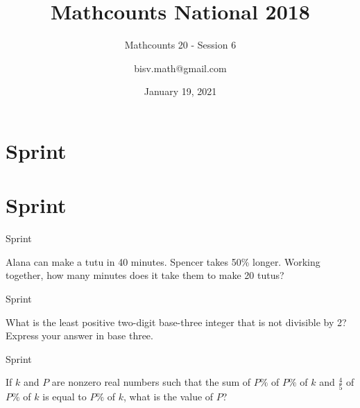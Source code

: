 \documentclass[9pt]{beamer}
\title{Mathcounts National 2018}
\subtitle{Mathcounts 20 - Session 6}
\author{bisv.math@gmail.com}
\institute{BISV Mathcounts Club 20}
\date{January 19, 2021}
\begin{document}
\titlepage



\section{Sprint}


\section{Sprint}
\begin{frame}[t]{Sprint \insertframenumber}
\begin{block}{}
    Alana can make a tutu in 40 minutes. Spencer takes 50\% longer. Working
    together, how many minutes does it take them to make 20 tutus?
        
\end{block}
\end{frame}

\begin{frame}[t]{Sprint \insertframenumber}
\begin{block}{}
    What is the least positive two-digit base-three integer that is not divisible by 2? Express your answer in base three.
    
\end{block}
\end{frame}

\begin{frame}[t]{Sprint \insertframenumber}
\begin{block}{}
    If $ k $ and $ P $ are nonzero real numbers such that the sum of $ P\% $ of $ P\% $ of $ k $ and
$ \frac{4}{5} $ of $ P\% $ of $ k $ is equal to $ P\% $ of $ k $, what is the value of $ P $?
    
\end{block}
\end{frame}
\end{document}
